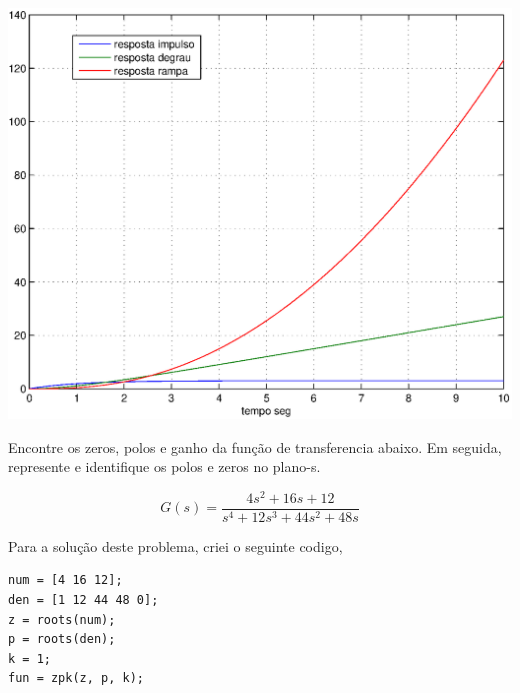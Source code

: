\documentclass[a4paper, 10pt]{article}
\begin{document}
\begin{list}{\textbf{Questão .}}{
\setlength{\labelwidth}{-2mm} \setlength{\parsep}{0mm}
\setlength{\topsep}{0mm} \setlength{\leftmargin}{0mm}}
\begin{enumerate}
             \begin{center}
                \includegraphics[scale=0.6]{fig2q.eps}
             \end{center}


    \end{enumerate}

\newpage

\item
    Encontre os zeros, polos e ganho da função de transferencia abaixo. Em seguida, 
    represente e identifique os polos e zeros no plano-s.

    $$
    G(s) = \frac{4 s^2 + 16 s + 12}{s^4 + 12 s^3 +  44 s^2 + 48 s}
    $$


    Para a solução deste problema, criei o seguinte codigo,

 
     \begin{lstlisting}
num = [4 16 12];
den = [1 12 44 48 0];
z = roots(num);
p = roots(den);
k = 1;
fun = zpk(z, p, k);
     \end{lstlisting}


\end{list}
\end{document}
